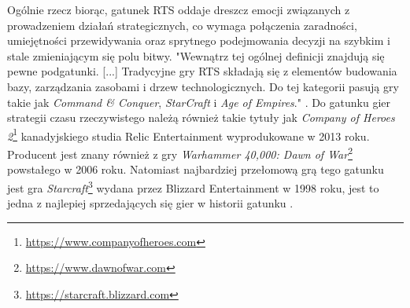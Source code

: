 Ogólnie rzecz biorąc, gatunek RTS oddaje dreszcz emocji związanych z prowadzeniem działań strategicznych, co wymaga połączenia zaradności,
umiejętności przewidywania oraz sprytnego podejmowania decyzji na szybkim i stale zmieniającym się polu bitwy.
"Wewnątrz tej ogólnej definicji znajdują się pewne podgatunki. [...] Tradycyjne gry RTS składają się z elementów budowania bazy, zarządzania zasobami i drzew technologicznych. Do tej kategorii pasują gry takie jak \textit{Command \& Conquer}, \textit{StarCraft} i \textit{Age of Empires}." \cite{stateoftherts}.
Do gatunku gier strategii czasu rzeczywistego należą również takie tytuły jak \textit{Company of Heroes 2}\footnote{\url{https://www.companyofheroes.com}} kanadyjskiego studia
Relic Entertainment wyprodukowane w 2013 roku. Producent jest znany również z gry \textit{Warhammer 40,000: Dawn of War}\footnote{\url{https://www.dawnofwar.com}} powstałego w 2006 roku.
Natomiast najbardziej przełomową grą tego gatunku jest gra \textit{Starcraft}\footnote{\url{https://starcraft.blizzard.com}} wydana przez Blizzard Entertainment w 1998 roku, jest to jedna z najlepiej sprzedających się gier w historii gatunku \cite{rtslist}.
